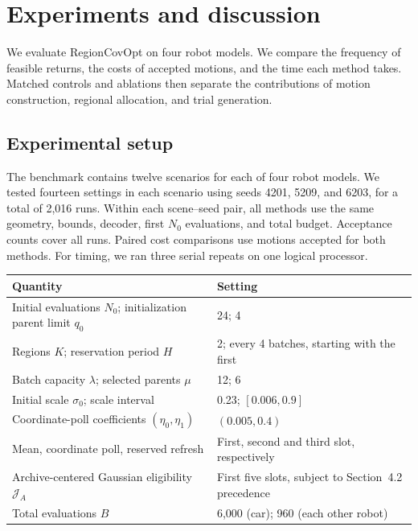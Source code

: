 \section{Experiments and discussion}
We evaluate RegionCovOpt on four robot models. We compare the frequency of feasible returns, the costs of accepted motions, and the time each method takes. Matched controls and ablations then separate the contributions of motion construction, regional allocation, and trial generation.

\subsection{Experimental setup}
The benchmark contains twelve scenarios for each of four robot models. We tested fourteen settings in each scenario using seeds 4201, 5209, and 6203, for a total of 2,016 runs. Within each scene--seed pair, all methods use the same geometry, bounds, decoder, first $N_0$ evaluations, and total budget. Acceptance counts cover all runs. Paired cost comparisons use motions accepted for both methods. For timing, we ran three serial repeats on one logical processor.

\begin{center}\begin{minipage}{\linewidth}\centering\small
{}\label{tab:settings}
\begin{tabular}{@{}p{.46\linewidth}p{.48\linewidth}@{}}\toprule
Quantity & Setting\\\midrule
Initial evaluations $N_0$; initialization parent limit $q_0$ & 24; 4\\
Regions $K$; reservation period $H$ & 2; every 4 batches, starting with the first\\
Batch capacity $\lambda$; selected parents $\mu$ & 12; 6\\
Initial scale $\sigma_0$; scale interval & 0.23; $[0.006,0.9]$\\
Coordinate-poll coefficients $(\eta_0,\eta_1)$ & $(0.005,0.4)$\\
Mean, coordinate poll, reserved refresh & First, second and third slot, respectively\\
Archive-centered Gaussian eligibility $\mathcal J_A$ & First five slots, subject to Section~4.2 precedence\\
Total evaluations $B$ & 6,000 (car); 960 (each other robot)\\
\bottomrule\end{tabular}\end{minipage}\end{center}

